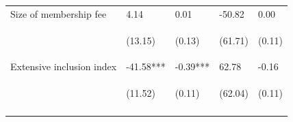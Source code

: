 \documentclass[11pt]{article}
\begin{document}
\begin{table}[H]
{\begin{tabularx}{1.5\linewidth}{lllll}
\noalign{\smallskip}Size of membership fee & 4.14 & 0.01 & -50.82 & 0.00\\
 & \begin{footnotesize}(13.15)\end{footnotesize} & \begin{footnotesize}(0.13)\end{footnotesize} & \begin{footnotesize}(61.71)\end{footnotesize} & \begin{footnotesize}(0.11)\end{footnotesize}\\
\noalign{\smallskip}Extensive inclusion index & -41.58*** & -0.39*** & 62.78 & -0.16\\
 & \begin{footnotesize}(11.52)\end{footnotesize} & \begin{footnotesize}(0.11)\end{footnotesize} & \begin{footnotesize}(62.04)\end{footnotesize} & \begin{footnotesize}(0.11)\end{footnotesize}\\ \\



\end{tabularx}}
\end{table}
\end{document}
